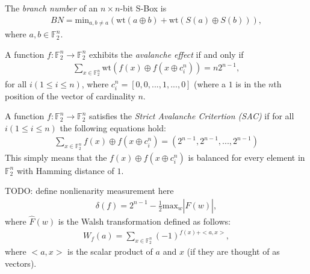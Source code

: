 \documentclass[11pt]{article}
\newcommand{\field}[1]{\mathbb{#1}} %
\begin{document}
\begin{define}
The \emph{branch number} of an $n \times n$-bit S-Box is
\begin{eqnarray*}
BN = \text{min}_{a, b\not=a}(\text{wt}(a \oplus b) + \text{wt}(S(a) \oplus S(b))),
\end{eqnarray*}
where $a, b \in \field{F}_2^n$.
\end{define}

\begin{define}
A function $f : \field{F}_2^n \to \field{F}_2^n$ exhibits the \emph{avalanche effect} if and only if 
\begin{eqnarray*}
\sum_{x \in \field{F}_2^n} \text{wt}(f(x) \oplus f(x \oplus c_{i}^{n})) = n2^{n-1},
\end{eqnarray*}
for all $i (1 \leq i \leq n)$, where $c_{i}^{n} = [0, 0, ..., 1, ..., 0]$ (where a $1$ is in the $n$th position of the vector of cardinality $n$.
\end{define}

\begin{define}
A function $f : \field{F}_2^n \to \field{F}_2^n$ satisfies the \emph{Strict Avalanche Critertion (SAC)} if for all $i (1 \leq i \leq n)$ the following equations hold:
\begin{eqnarray*}
\sum_{x \in \field{F}_2^n} f(x) \oplus f(x \oplus c_i^n) = (2^{n-1}, 2^{n-1}, ..., 2^{n-1})
\end{eqnarray*}
This simply means that the $f(x) \oplus f(x \oplus c_i^n)$ is balanced for every element in $\field{F}_2^n$ with Hamming distance of $1$. 
\end{define}

\begin{define}


TODO: define nonlienarity measurement here
\begin{eqnarray*}
\delta(f)  = 2^{n-1} - \frac{1}{2}\text{max}_w|\hat{F}(w)|,
\end{eqnarray*}
where $\hat{F}(w)$ is the Walsh transformation defined as follows:
\begin{eqnarray*}
W_f(a) = \sum_{x \in \field{F}_2^n} (-1)^{f(x) + <a,x>},
\end{eqnarray*}
where $<a,x>$ is the scalar product of $a$ and $x$ (if they are thought of as vectors).
\end{define}
\end{document}
